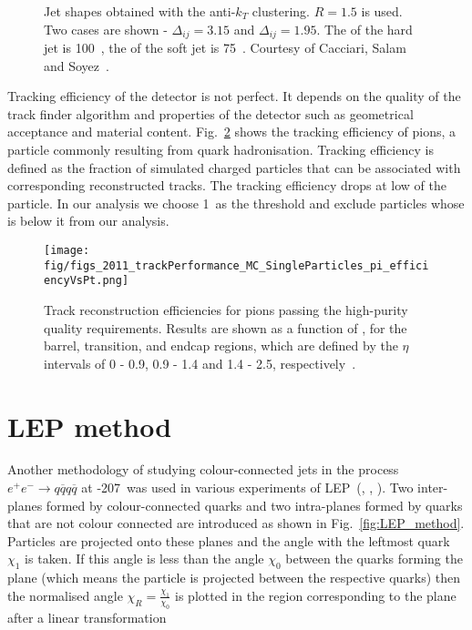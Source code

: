 \begin{figure}[hbtp]
  \def\twidth{0.5}
  \hfil
   \caption{Jet shapes obtained with the anti-$k_{T}$ clustering. $R=1.5$ is used. Two cases are shown - $\Delta_{ij}=3.15$ and  $\Delta_{ij}=1.95$. The \pt of the hard jet is 100~\GeV, the \pt of the soft jet is 75~\GeV. Courtesy of Cacciari, Salam and Soyez~\cite{github:antikt}.}
  \label{fig:anti_kt}
\end{figure}

Tracking efficiency of the detector is not perfect. It depends on the quality of the track finder algorithm and properties of the detector such as geometrical acceptance and material content. Fig.~\ref{fig:2011_trackPerformance_MC_SingleParticles_pi_efficiencyVsPt} shows the tracking efficiency of pions, a particle commonly resulting from quark hadronisation. Tracking efficiency is defined as the fraction of simulated charged particles that can be associated with corresponding reconstructed tracks. The tracking efficiency drops at low \pt of the particle. In our analysis we choose 1~\GeV as the threshold and exclude particles whose \pt is below it from our analysis.

\begin{figure}[hbtp]
    \texttt{[image: fig/figs\_2011\_trackPerformance\_MC\_SingleParticles\_pi\_efficiencyVsPt.png]}
    \caption{Track reconstruction efficiencies for pions passing the high-purity quality requirements. Results are shown as a function of \pt, for the barrel, transition, and endcap regions, which are defined by the $\eta$ intervals of 0 - 0.9, 0.9 - 1.4 and 1.4 - 2.5, respectively~\cite{Chatrchyan:2014fea}.}
    \label{fig:2011_trackPerformance_MC_SingleParticles_pi_efficiencyVsPt}
\end{figure}

\section{LEP method}

Another methodology of studying colour-connected jets in the process $e^{+}e^{-}\rightarrow q\overline{q}q\overline{q}$ at -207~\GeV was used in various experiments of LEP~(\cite{Abdallah:2006uq}, \cite{Abbiendi:2005es}, \cite{Achard:2003pe}). Two inter-\PW planes formed by colour-connected quarks and two intra-\PW planes formed by quarks that are not colour connected are introduced as shown in Fig.~\ref{fig:LEP_method}. Particles are projected onto these planes and the angle with the leftmost quark $\chi_{1}$ is taken. If this angle is less than the angle $\chi_{0}$ between the quarks forming the plane (which means the particle is projected between the respective quarks) then the normalised angle $\chi_{R}=\frac{\chi_{1}}{\chi_{0}}$ is plotted in the region corresponding to the plane after a linear transformation

